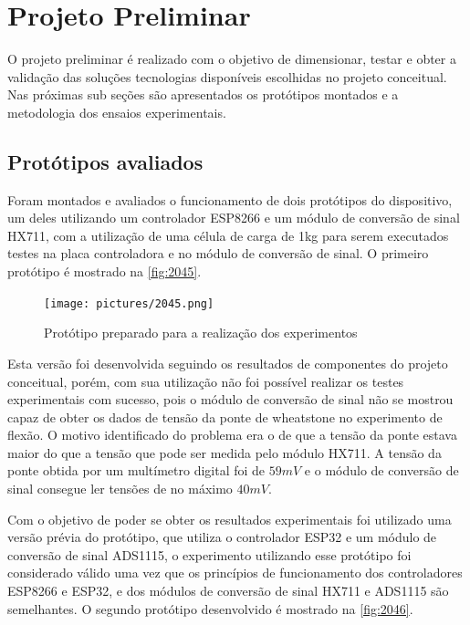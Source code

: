 \section{Projeto Preliminar}

O projeto preliminar é realizado com o objetivo de dimensionar, testar e obter a validação das soluções tecnologias disponíveis escolhidas no projeto conceitual.
Nas próximas sub seções são apresentados os protótipos montados e a metodologia dos ensaios experimentais.

\subsection{Protótipos avaliados}

Foram montados e avaliados o funcionamento de dois protótipos do dispositivo, um deles utilizando um controlador ESP8266 e um módulo de conversão de sinal HX711,
com a utilização de uma célula de carga de 1kg para serem executados testes na placa controladora e no módulo de conversão de sinal.
O primeiro protótipo é mostrado na \autoref{fig:2045}.

\begin{figure}[H]
	\caption{\label{fig:2045} Protótipo preparado para a realização dos experimentos}
		\begin{center}
			\texttt{[image: pictures/2045.png]}
		\end{center}
\end{figure}

Esta versão foi desenvolvida seguindo os resultados de componentes do projeto conceitual, porém, com sua utilização não foi possível realizar os testes experimentais com sucesso,
pois o módulo de conversão de sinal não se mostrou capaz de obter os dados de tensão da ponte de wheatstone no experimento de flexão.
O motivo identificado do problema era o de que a tensão da ponte estava maior do que a tensão que pode ser medida pelo módulo HX711.
A tensão da ponte obtida por um multímetro digital foi de $ 59mV $ e o módulo de conversão de sinal consegue ler tensões de no máximo $ 40mV $.

Com o objetivo de poder se obter os resultados experimentais foi utilizado uma versão prévia do protótipo, que utiliza o controlador ESP32 e um módulo de conversão
de sinal ADS1115, o experimento utilizando esse protótipo foi considerado válido uma vez que os princípios de funcionamento dos controladores ESP8266 e ESP32,
e dos módulos de conversão de sinal HX711 e ADS1115 são semelhantes.
O segundo protótipo desenvolvido é mostrado na \autoref{fig:2046}.

